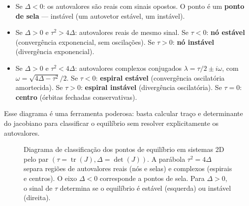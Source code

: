 \begin{itemize}
\item Se $\Delta < 0$: os autovalores são reais com sinais opostos. O ponto é um
  \textbf{ponto de sela} --- instável (um autovetor estável, um instável).

\item Se $\Delta > 0$ e $\tau^2 > 4\Delta$: autovalores reais de mesmo sinal.
  Se $\tau < 0$: \textbf{nó estável} (convergência exponencial, sem oscilações).
  Se $\tau > 0$: \textbf{nó instável} (divergência exponencial).

\item Se $\Delta > 0$ e $\tau^2 < 4\Delta$: autovalores complexos conjugados
  $\lambda = \tau/2 \pm i\omega$, com $\omega = \sqrt{4\Delta - \tau^2}/2$.
  Se $\tau < 0$: \textbf{espiral estável} (convergência oscilatória amortecida).
  Se $\tau > 0$: \textbf{espiral instável} (divergência oscilatória).
  Se $\tau = 0$: \textbf{centro} (órbitas fechadas conservativas).
\end{itemize}

Esse diagrama é uma ferramenta poderosa: basta calcular traço e determinante do jacobiano
para classificar o equilíbrio sem resolver explicitamente os autovalores.

\begin{figure}[htbp]
\centering
{}
\caption{Diagrama de classificação dos pontos de equilíbrio em sistemas 2D pelo par $(\tau = \operatorname{tr}(J), \Delta = \det(J))$. A parábola $\tau^2 = 4\Delta$ separa regiões de autovalores reais (nós e selas) e complexos (espirais e centros). O eixo $\Delta < 0$ corresponde a pontos de sela. Para $\Delta > 0$, o sinal de $\tau$ determina se o equilíbrio é estável (esquerda) ou instável (direita).}
\label{fig:04-classificacao}
\end{figure}

